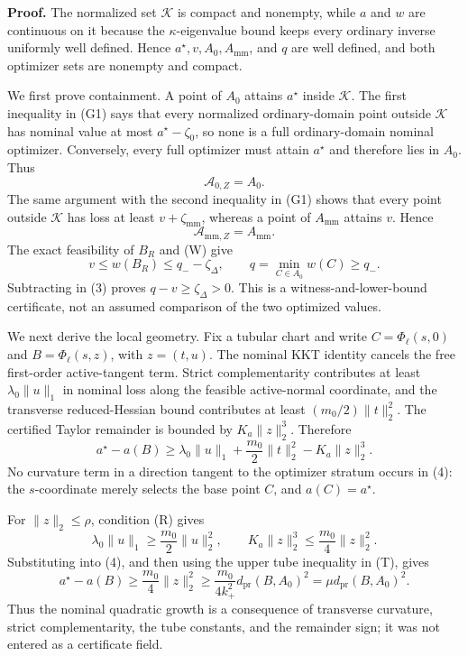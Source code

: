 \textbf{Proof.}
The normalized set \(\mathcal K\) is compact and nonempty, while \(a\) and \(w\) are continuous on it because the \(\kappa\)-eigenvalue bound keeps every ordinary inverse uniformly well defined.  Hence \(a^\star,v,A_0,A_{\mathrm{mm}}\), and \(q\) are well defined, and both optimizer sets are nonempty and compact.

We first prove containment.  A point of \(A_0\) attains \(a^\star\) inside \(\mathcal K\).  The first inequality in (G1) says that every normalized ordinary-domain point outside \(\mathcal K\) has nominal value at most \(a^\star-\zeta_0\), so none is a full ordinary-domain nominal optimizer.  Conversely, every full optimizer must attain \(a^\star\) and therefore lies in \(A_0\).  Thus
\[
\mathcal A_{0,Z}=A_0.
\tag{1}
\]
The same argument with the second inequality in (G1) shows that every point outside \(\mathcal K\) has loss at least \(v+\zeta_{\mathrm{mm}}\), whereas a point of \(A_{\mathrm{mm}}\) attains \(v\).  Hence
\[
\mathcal A_{\mathrm{mm},Z}=A_{\mathrm{mm}}.
\tag{2}
\]
The exact feasibility of \(B_R\) and (W) give
\[
v\le w(B_R)\le q_- -\zeta_\Delta,
\qquad
q=\min_{C\in A_0}w(C)\ge q_-.
\tag{3}
\]
Subtracting in (3) proves \(q-v\ge\zeta_\Delta>0\).  This is a witness-and-lower-bound certificate, not an assumed comparison of the two optimized values.

We next derive the local geometry.  Fix a tubular chart and write \(C=\Phi_\ell(s,0)\) and \(B=\Phi_\ell(s,z)\), with \(z=(t,u)\).  The nominal KKT identity cancels the free first-order active-tangent term.  Strict complementarity contributes at least \(\lambda_0\lVert u\rVert_1\) in nominal loss along the feasible active-normal coordinate, and the transverse reduced-Hessian bound contributes at least \((m_0/2)\lVert t\rVert_2^2\).  The certified Taylor remainder is bounded by \(K_a\lVert z\rVert_2^3\).  Therefore
\[
a^\star-a(B)
\ge \lambda_0\lVert u\rVert_1
+\frac{m_0}{2}\lVert t\rVert_2^2
-K_a\lVert z\rVert_2^3.
\tag{4}
\]
No curvature term in a direction tangent to the optimizer stratum occurs in (4): the \(s\)-coordinate merely selects the base point \(C\), and \(a(C)=a^\star\).

For \(\lVert z\rVert_2\le\rho\), condition (R) gives
\[
\lambda_0\lVert u\rVert_1
\ge\frac{m_0}{2}\lVert u\rVert_2^2,
\qquad
K_a\lVert z\rVert_2^3
\le\frac{m_0}{4}\lVert z\rVert_2^2.
\]
Substituting into (4), and then using the upper tube inequality in (T), gives
\[
a^\star-a(B)
\ge\frac{m_0}{4}\lVert z\rVert_2^2
\ge\frac{m_0}{4k_+^2}d_{\mathrm{pr}}(B,A_0)^2
=\mu d_{\mathrm{pr}}(B,A_0)^2.
\tag{5}
\]
Thus the nominal quadratic growth is a consequence of transverse curvature, strict complementarity, the tube constants, and the remainder sign; it was not entered as a certificate field.

